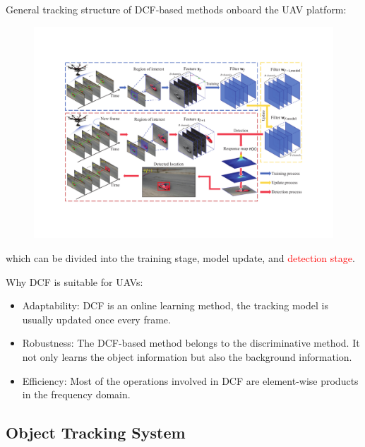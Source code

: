 \documentclass{beamer}
\begin{document}
\begin{frame}

    \addtocounter{footnote}{-1}
    \addtocounter{framenumber}{-1}
    General tracking structure of DCF-based methods onboard the UAV platform:

    \begin{figure}[htpb]
        \begin{center}
            \includegraphics[width=0.7\linewidth, trim={100pt 100 100 90}]{fig/tracking_3.pdf}
        \end{center}
    \end{figure}

    which can be divided into the training stage, model update, and \textcolor{red}{detection stage}.

\end{frame}

\begin{frame}
    Why DCF is suitable for UAVs:
    \begin{itemize}
        \item Adaptability: DCF is an online learning method, the tracking model is usually updated once every frame.
        \item Robustness: The DCF-based method belongs to the discriminative method. It not only learns the object information but also the background information. 
        \item Efficiency: Most of the operations involved in DCF are element-wise products in the frequency domain.
    \end{itemize}
\end{frame}

\subsection{Object Tracking System}
\end{document}
